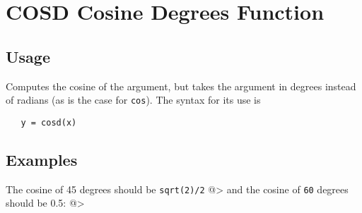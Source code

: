 \section{COSD Cosine Degrees Function}

\subsection{Usage}

Computes the cosine of the argument, but takes
the argument in degrees instead of radians (as is the case
for \verb|cos|). The syntax for its use is
\begin{verbatim}
   y = cosd(x)
\end{verbatim}
\subsection{Examples}

The cosine of 45 degrees should be \verb|sqrt(2)/2|
@>
and the cosine of \verb|60| degrees should be 0.5:
@>
